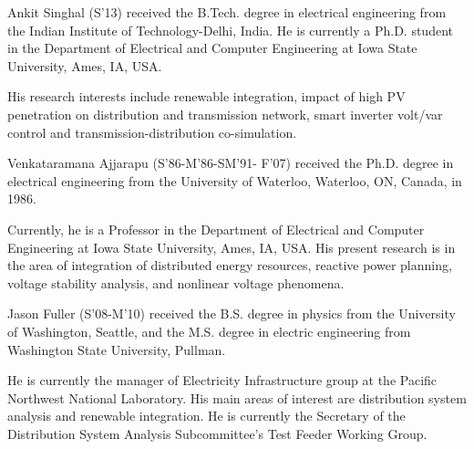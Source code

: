 \documentclass[journal]{IEEEtran}
\begin{document}
% 
 \begin{IEEEbiography}
 {Ankit Singhal}
  (S'13) received the B.Tech. degree in electrical engineering
from the Indian Institute of
Technology-Delhi, India. He is currently
a Ph.D. student in the Department of Electrical and Computer Engineering at Iowa State
University, Ames, IA, USA.

His research interests include renewable integration, impact of high PV penetration on distribution and transmission network, smart inverter volt/var control and transmission-distribution co-simulation.
 \end{IEEEbiography}
 \begin{IEEEbiography}
 {Venkataramana Ajjarapu}
  (S'86-M'86-SM'91-
F'07) received the Ph.D. degree in electrical engineering from the University of Waterloo, Waterloo, ON, Canada, in 1986.

Currently, he is a Professor in the Department of Electrical and Computer Engineering at Iowa State University, Ames, IA, USA. His present research is in the area of integration of distributed energy resources, reactive power planning, voltage stability analysis, and nonlinear voltage phenomena.
 \end{IEEEbiography}
 
  \begin{IEEEbiography}
 {Jason Fuller}
  (S'08-M'10) received the B.S. degree
in physics from the University of Washington,
Seattle, and the M.S. degree in electric engineering from Washington State University, Pullman.

He is currently the manager of Electricity Infrastructure group at the Pacific Northwest National Laboratory. His main areas of interest are distribution system analysis and renewable integration. He is currently the Secretary of the Distribution System Analysis Subcommittee’s Test Feeder Working Group.
\end{IEEEbiography}
\end{document}
